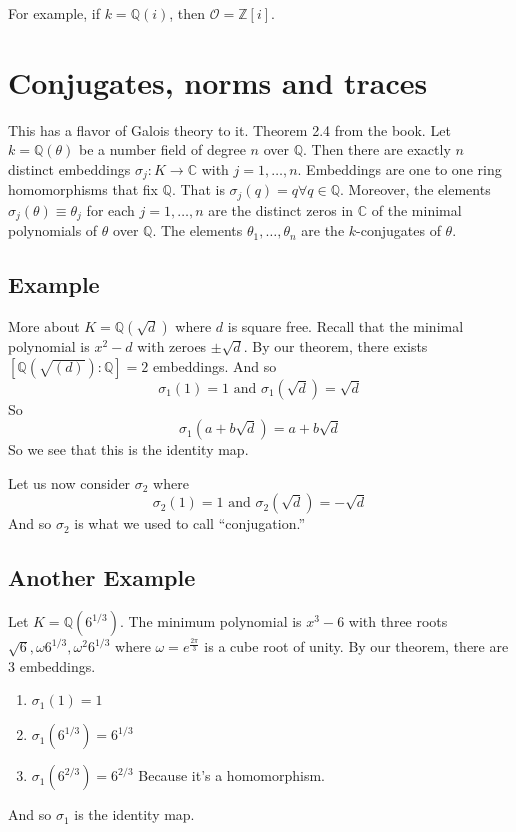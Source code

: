 \documentclass{article}
\begin{document}
For example, if $k = \mathbb{Q}(i)$, then $\mathcal{O} = \mathbb{Z}[i]$.

\section{Conjugates, norms and traces}
This has a flavor of Galois theory to it. Theorem 2.4 from the book. 
Let $k = \mathbb{Q}(\theta)$ be a number field of degree $n$ over $\mathbb{Q}$.
Then there are exactly $n$ distinct embeddings $\sigma_j: K \rightarrow
\mathbb{C}$ with $j = 1, \ldots, n$. Embeddings are one to one ring
homomorphisms that fix $\mathbb{Q}$. That is $\sigma_j(q) = q \forall q \in
\mathbb{Q}$. Moreover, the elements $\sigma_j(\theta)\equiv \theta_j$ for each
$j = 1,\ldots,n$ are the distinct zeros in $\mathbb{C}$ of the minimal
polynomials of $\theta$ over $\mathbb{Q}$. The elements $\theta_1, \ldots,
\theta_n$ are the $k$-conjugates of $\theta$.

\subsection{Example}
More about $K=\mathbb{Q}(\sqrt{d})$ where $d$ is square free. Recall that the
minimal polynomial is $x^2 - d$ with zeroes $\pm \sqrt{d}$. By our theorem,
there exists $ [\mathbb{Q}(\sqrt{(d)}) : \mathbb{Q} ] = 2$ embeddings. And so
\[ \sigma_1(1) = 1 \text{ and } \sigma_1(\sqrt{d}) = \sqrt{d} \]
So 
\[ \sigma_1(a + b \sqrt{d}) = a + b \sqrt{d} \]
So we see that this is the identity map. 

Let us now consider $\sigma_2$ where
\[ \sigma_2(1) = 1 \text{ and } \sigma_2(\sqrt{d}) = - \sqrt{d} \]
And so $\sigma_2$ is what we used to call ``conjugation.''

\subsection{Another Example}
Let $K = \mathbb{Q}(6^{1/3})$. The minimum polynomial is $x^3 - 6$ with three
roots $\sqrt{6}, \omega 6^{1/3}, \omega^2 6^{1/3}$
where $\omega = e^{\frac{2 \pi}{3}}$ is a cube root of unity. By our theorem,
there are 3 embeddings. 
\begin{enumerate}
\item $\sigma_1( 1 ) = 1$
\item $\sigma_1( 6^{1/3} ) = 6^{1/3}$
\item $\sigma_1(6^{2/3}) = 6^{2/3}$ Because it's a homomorphism. 
\end{enumerate}
And so $\sigma_1$ is the identity map. 
\end{document}
